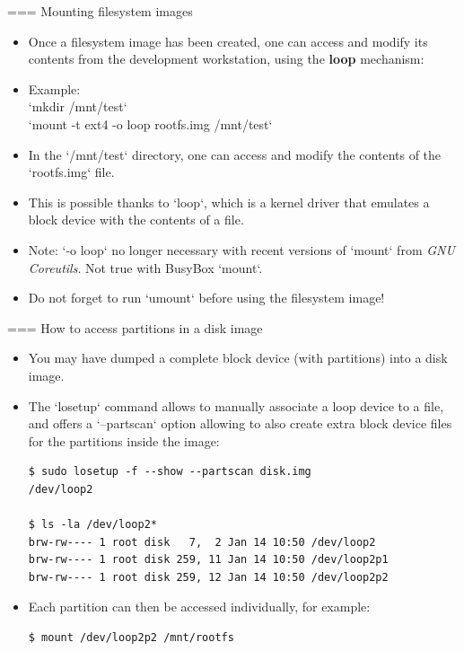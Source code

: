 === Mounting filesystem images
  \begin{itemize}
  \item Once a filesystem image has been created, one can access and
    modify its contents from the development workstation, using the
    {\bf loop} mechanism:
  \item Example:\\
    `mkdir /mnt/test`\\
    `mount -t ext4 -o loop rootfs.img /mnt/test`
  \item In the `/mnt/test` directory, one can access and modify
    the contents of the `rootfs.img` file.
  \item This is possible thanks to `loop`, which is a kernel
    driver that emulates a block device with the contents of a file.
  \item Note: `-o loop` no longer necessary with recent versions
        of `mount` from {\em GNU Coreutils}. Not true with BusyBox
       `mount`.
  \item Do not forget to run `umount` before using the filesystem
    image!
  \end{itemize}


=== How to access partitions in a disk image
  \begin{itemize}
  \item You may have dumped a complete block device (with partitions) into a disk image.
  \item The `losetup` command allows to manually associate
    a loop device to a file, and offers a `--partscan` option
    allowing to also create extra block device files for the partitions
    inside the image:
    \begin{block}{}
    \begin{verbatim}
$ sudo losetup -f --show --partscan disk.img
/dev/loop2

$ ls -la /dev/loop2*
brw-rw---- 1 root disk   7,  2 Jan 14 10:50 /dev/loop2
brw-rw---- 1 root disk 259, 11 Jan 14 10:50 /dev/loop2p1
brw-rw---- 1 root disk 259, 12 Jan 14 10:50 /dev/loop2p2
\end{verbatim}
    \end{block}{}
  \item Each partition can then be accessed individually, for example:
    \begin{block}{}
    \begin{verbatim}
$ mount /dev/loop2p2 /mnt/rootfs
\end{verbatim}
    \end{block}{}
  \end{itemize}


